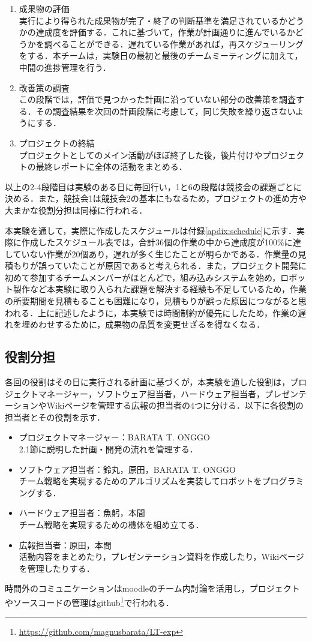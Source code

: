 \begin{multicols*}{2}
\begin{enumerate}
  \item 成果物の評価\\ 実行により得られた成果物が完了・終了の判断基準を満足されているかどうかの達成度を評価する．これに基づいて，作業が計画通りに進んでいるかどうかを調べることができる．遅れている作業があれば，再スケジューリングをする．本チームは，実験日の最初と最後のチームミーティングに加えて，中間の進捗管理を行う．
  \item 改善策の調査\\ この段階では，評価で見つかった計画に沿っていない部分の改善策を調査する．その調査結果を次回の計画段階に考慮して，同じ失敗を繰り返さないようにする．
  \item プロジェクトの終結\\ プロジェクトとしてのメイン活動がほぼ終了した後，後片付けやプロジェクトの最終レポートに全体の活動をまとめる．
\end{enumerate}
以上の2-4段階目は実験のある日に毎回行い，1と6の段階は競技会の課題ごとに決める．また，競技会1は競技会2の基本にもなるため，プロジェクトの進め方や大まかな役割分担は同様に行われる．

本実験を通して，実際に作成したスケジュールは付録\ref{apdix:schedule}に示す．実際に作成したスケジュール表では，合計36個の作業の中から達成度が100\%に達していない作業が20個あり，遅れが多く生じたことが明らかである．作業量の見積もりが誤っていたことが原因であると考えられる．また，プロジェクト開発に初めて参加するチームメンバーがほとんどで，組み込みシステムを始め，ロボット製作など本実験に取り入られた課題を解決する経験も不足しているため，作業の所要期間を見積もることも困難になり，見積もりが誤った原因につながると思われる．上に記述したように，本実験では時間制約が優先にしたため，作業の遅れを埋めわせするために，成果物の品質を変更せざるを得なくなる．

\subsection{役割分担}
 各回の役割はその日に実行される計画に基づくが，本実験を通した役割は，プロジェクトマネージャー，ソフトウェア担当者，ハードウェア担当者，プレゼンテーションやWikiページを管理する広報の担当者の4つに分ける．以下に各役割の担当者とその役割を示す．
 \begin{itemize}
  \item プロジェクトマネージャー：BARATA T. ONGGO \\ 2.1節に説明した計画・開発の流れを管理する．
  \item ソフトウェア担当者：鈴丸，原田，BARATA T. ONGGO \\ チーム戦略を実現するためのアルゴリズムを実装してロボットをプログラミングする．
  \item ハードウェア担当者：魚躬，本間 \\ チーム戦略を実現するための機体を組め立てる．
  \item 広報担当者：原田，本間\\ 活動内容をまとめたり，プレゼンテーション資料を作成したり，Wikiページを管理したりする．
 \end{itemize}
 時間外のコミュニケーションはmoodleのチーム内討論を活用し，プロジェクトやソースコードの管理はgithub\footnote{\url{https://github.com/magnusbarata/LT-exp}}で行われる．
 

\end{multicols*}
